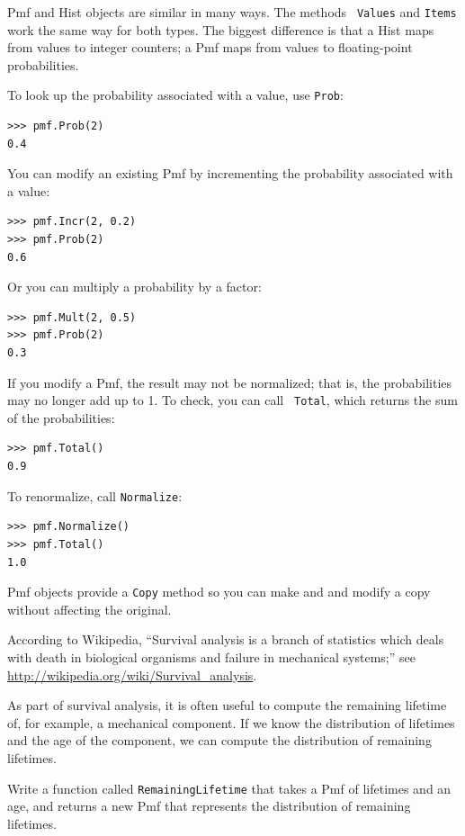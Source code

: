 \documentclass[12pt]{book}
\begin{document}
Pmf and Hist objects are similar in many ways.  The methods {\tt
  Values} and {\tt Items} work the same way for both types.  The
biggest difference is that a Hist maps from values to integer
counters; a Pmf maps from values to floating-point probabilities.

To look up the probability associated with a value, use {\tt Prob}:
%
\begin{verbatim}
>>> pmf.Prob(2)
0.4
\end{verbatim}

You can modify an existing Pmf by incrementing the probability
associated with a value:
%
\begin{verbatim}
>>> pmf.Incr(2, 0.2)
>>> pmf.Prob(2)
0.6
\end{verbatim}

Or you can multiply a probability by a factor:
%
\begin{verbatim}
>>> pmf.Mult(2, 0.5)
>>> pmf.Prob(2)
0.3
\end{verbatim}

If you modify a Pmf, the result may not be normalized; that is, the
probabilities may no longer add up to 1.  To check, you can call {\tt
  Total}, which returns the sum of the probabilities:
%
\begin{verbatim}
>>> pmf.Total()
0.9
\end{verbatim}

To renormalize, call {\tt Normalize}:
%
\begin{verbatim}
>>> pmf.Normalize()
>>> pmf.Total()
1.0
\end{verbatim}

Pmf objects provide a {\tt Copy} method so you can make and
and modify a copy without affecting the original.

\begin{exercise}
According to Wikipedia, ``Survival analysis is a branch of statistics
which deals with death in biological organisms and failure in
mechanical systems;'' see \url{http://wikipedia.org/wiki/Survival_analysis}.

As part of survival analysis, it is often useful to compute the
remaining lifetime of, for example, a mechanical component.  If we
know the distribution of lifetimes and the age of the component,
we can compute the distribution of remaining lifetimes.

Write a function called {\tt RemainingLifetime} that takes a
Pmf of lifetimes and an age, and returns a new Pmf that represents
the distribution of remaining lifetimes.

\end{exercise}
\end{document}
